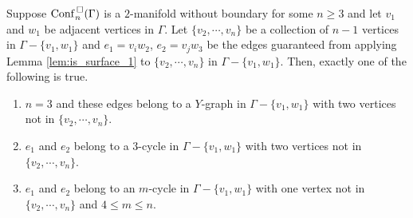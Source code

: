 \begin{lem}
    \label{lem:is_surface_2}
    Suppose \(\mathrm{Conf}^{\,\square}_n(\Gamma)\) is a \(2\)-manifold without boundary for some \(n \ge 3\) and let \(v_1\) and \(w_1\) be adjacent vertices in \(\Gamma\).
    Let \(\{v_2, \cdots, v_n\}\) be a collection of \(n-1\) vertices in \(\Gamma - \{v_1, w_1\}\) 
    and \(e_1 = v_i w_2\), \(e_2 = v_j w_3\) be the edges guaranteed
    from applying Lemma \ref{lem:is_surface_1} to \(\{v_2, \cdots, v_n\}\) in \(\Gamma - \{v_1, w_1\}\).
    Then, exactly one of the following is true.
    \begin{enumerate}
        \item \(n = 3\) and these edges belong to a \(Y\)-graph in \(\Gamma - \{v_1, w_1\}\) with two vertices not in \(\{v_2, \cdots, v_n\}\).
        \item \(e_1\) and \(e_2\) belong to a \(3\)-cycle in \(\Gamma - \{v_1, w_1\}\) with two vertices not in \(\{v_2, \cdots, v_n\}\).
        \item \(e_1\) and \(e_2\) belong to an \(m\)-cycle in \(\Gamma - \{v_1, w_1\}\) with one vertex not in \(\{v_2, \cdots, v_n\}\) and \(4 \le m \le n\).
    \end{enumerate}
\end{lem}
